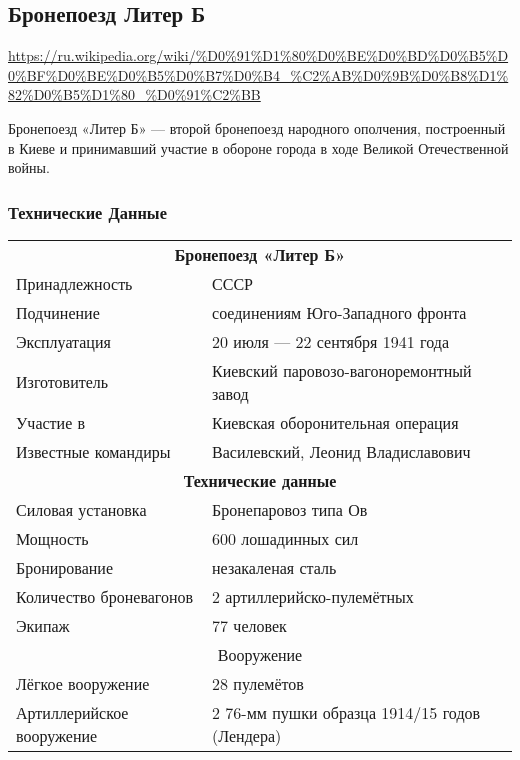  
 
\subsection{Бронепоезд Литер Б}
\url{https://ru.wikipedia.org/wiki/%D0%91%D1%80%D0%BE%D0%BD%D0%B5%D0%BF%D0%BE%D0%B5%D0%B7%D0%B4_%C2%AB%D0%9B%D0%B8%D1%82%D0%B5%D1%80_%D0%91%C2%BB}
  
Бронепоезд «Литер Б» — второй бронепоезд народного ополчения, построенный в
Киеве и принимавший участие в обороне города в ходе Великой Отечественной
войны.  

\subsubsection{Технические Данные}

\begin{longtable}{|l|l|}
				\multicolumn{2}{c}{\textbf{Бронепоезд «Литер Б»}} \\
Принадлежность      & СССР                                    \\
Подчинение          & соединениям Юго-Западного фронта        \\
Эксплуатация        & 20 июля — 22 сентября 1941 года         \\
Изготовитель        & Киевский паровозо-вагоноремонтный завод \\
Участие в           & Киевская оборонительная операция        \\
Известные командиры & Василевский, Леонид Владиславович       \\
				\multicolumn{2}{|c|}{\textbf{Технические данные}}                  \\
Силовая установка       & Бронепаровоз типа Ов          \\
Мощность                & 600 лошадинных сил            \\
Бронирование            & незакаленая сталь             \\
Количество броневагонов & 2 артиллерийско-пулемётных    \\
Экипаж                  & 77 человек\cite{Kajnaran2012} \\
\multicolumn{2}{c}{Вооружение} \\
Лёгкое вооружение         & 28 пулемётов \cite{Kolomiec2010}\\
Артиллерийское вооружение & 
2 76-мм пушки образца 1914/15 годов (Лендера) \cite{Kajnaran2012,Kolomiec2010,Kolomiec2010a}\\
\end{longtable}

